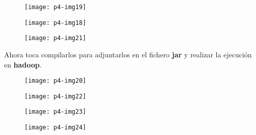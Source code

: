 \documentclass[10pt]{article}
\begin{document}
\begin{figure}[H]
	\begin{center}
 		\texttt{[image: p4-img19]}
	\end{center} 
\end{figure}

\begin{figure}[H]
	\begin{center}
 		\texttt{[image: p4-img18]}
	\end{center} 
\end{figure}

\begin{figure}[H]
	\begin{center}
 		\texttt{[image: p4-img21]}
	\end{center} 
\end{figure}

Ahora toca compilarlos para adjuntarlos en el fichero \textbf{jar} y realizar la ejecución en \textbf{hadoop}. \\

\begin{figure}[H]
	\begin{center}
 		\texttt{[image: p4-img20]}
	\end{center} 
\end{figure}

\begin{figure}[H]
	\begin{center}
 		\texttt{[image: p4-img22]}
	\end{center} 
\end{figure}

\begin{figure}[H]
	\begin{center}
 		\texttt{[image: p4-img23]}
	\end{center} 
\end{figure}

\begin{figure}[H]
	\begin{center}
 		\texttt{[image: p4-img24]}
	\end{center} 
\end{figure}
\end{document}
